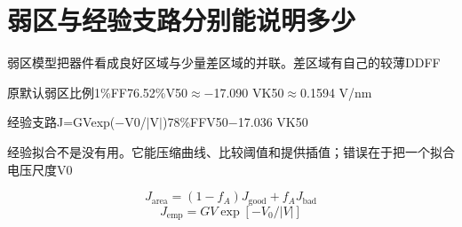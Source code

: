 \documentclass[11pt,a4paper]{article}
\begin{document}
\section{{\cjkfont 弱区与经验支路分别能说明多少}\allowbreak{}}\label{sec:36}
{\cjkfont 弱区模型把器件看成良好区域与少量差区域的并联。差区域有自己的较薄}\allowbreak{}DD\allowbreak{}FF\allowbreak{}
\par
{\cjkfont 原默认弱区比例}\allowbreak{}1\%\allowbreak{}FF\allowbreak{}76.52\%\allowbreak{}V50\ensuremath{\approx}\allowbreak{}−17.090 V\allowbreak{}K50\ensuremath{\approx}\allowbreak{}0.1594 V/nm\allowbreak{}
\par
{\cjkfont 经验支路}\allowbreak{}J=\allowbreak{}GVexp(−V0/\ensuremath{\vert}V\ensuremath{\vert})\allowbreak{}78\%FF\allowbreak{}V50\allowbreak{}−17.036 V\allowbreak{}K50\allowbreak{}
\par
{\cjkfont 经验拟合不是没有用。它能压缩曲线、比较阈值和提供插值；错误在于把一个拟合电压尺度}\allowbreak{}V0\allowbreak{}
\par
\begin{equation}
J_{\mathrm{area}}=(1-f_A)J_{\mathrm{good}}+f_AJ_{\mathrm{bad}}
\label{eq:41}\end{equation}
\begin{equation}
J_{\mathrm{emp}}=GV\exp[-V_0/|V|]
\label{eq:42}\end{equation}
\end{document}
